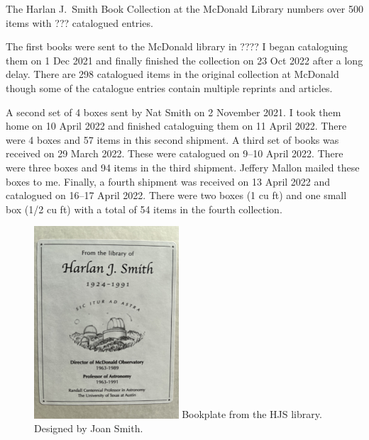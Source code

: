 

The Harlan J.~Smith Book Collection at the McDonald Library
numbers over 500 items with ??? catalogued entries.

The first books were sent to the McDonald library in ????  I began
cataloguing them on 1 Dec 2021 and finally finished the collection on
23 Oct 2022 after a long delay. There are 298 catalogued items in the
original collection at McDonald though some of the catalogue entries
contain multiple reprints and articles.

A second set of 4 boxes sent by Nat Smith on 2 November 2021.  I took
them home on 10 April 2022 and finished cataloguing them on 11 April
2022. There were 4 boxes and 57 items in this second shipment. A third
set of books was received on 29 March 2022. These were catalogued on
9--10 April 2022. There were three boxes and 94 items in the third
shipment. Jeffery Mallon mailed these boxes to me. Finally, a fourth
shipment was received on 13 April 2022 and catalogued on 16--17 April
2022. There were two boxes (1 cu ft) and one small box (1/2 cu ft)
with a total of 54 items in the fourth collection.

\begin{figure}
  \centering
  \includegraphics[width=0.48\textwidth]{hjs_bookplate_small.png}
  Bookplate from the HJS library. Designed by Joan Smith.
  \label{fig:bookplate}
\end{figure}

